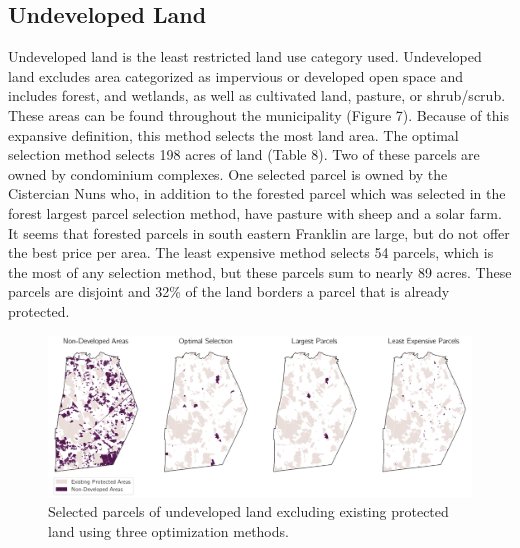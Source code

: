 \documentclass[12pt, stu, floatsintext,table]{apa7}
\begin{document}
\subsection{Undeveloped Land}
Undeveloped land is the least restricted land use category used. Undeveloped land excludes area categorized as impervious or developed open space and includes forest, and wetlands, as well as cultivated land, pasture, or shrub/scrub. These areas can be found throughout the municipality (Figure 7). Because of this expansive definition, this method selects the most land area. The optimal selection method selects 198 acres of land (Table 8). Two of these parcels are owned by condominium complexes. One selected parcel is owned by the Cistercian Nuns who, in addition to the forested parcel which was selected in the forest largest parcel selection method, have pasture with sheep and a solar farm. It seems that forested parcels in south eastern Franklin are large, but do not offer the best price per area. The least expensive method selects 54 parcels, which is the most of any selection method, but these parcels sum to nearly 89 acres. These parcels are disjoint and 32\% of the land borders a parcel that is already protected. 
\begin{figure}[hbtp]
    \centering
    \includegraphics[width = \textwidth]{figures/n_61ndev.png}
    \caption{Selected parcels of undeveloped land excluding existing protected land using three optimization methods. }
\end{figure}
\end{document}
